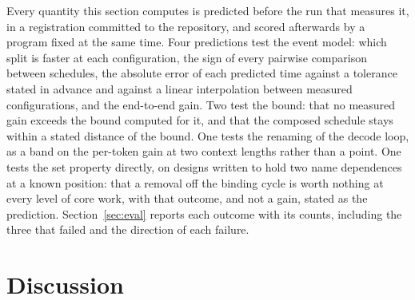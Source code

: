 Every quantity this section computes is predicted before the run that measures it, in a registration committed to the repository, and scored afterwards by a program fixed at the same time.
Four predictions test the event model: which split is faster at each configuration, the sign of every pairwise comparison between schedules, the absolute error of each predicted time against a tolerance stated in advance and against a linear interpolation between measured configurations, and the end-to-end gain.
Two test the bound: that no measured gain exceeds the bound computed for it, and that the composed schedule stays within a stated distance of the bound.
One tests the renaming of the decode loop, as a band on the per-token gain at two context lengths rather than a point.
One tests the set property directly, on designs written to hold two name dependences at a known position: that a removal off the binding cycle is worth nothing at every level of core work, with that outcome, and not a gain, stated as the prediction.
Section~\ref{sec:eval} reports each outcome with its counts, including the three that failed and the direction of each failure.

\section{Discussion}
\label{app:discussion}

